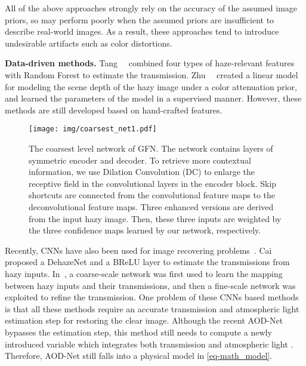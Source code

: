 \documentclass[10pt,twocolumn,letterpaper]{article}
\begin{document}
All of the above approaches strongly rely on the accuracy of the assumed image priors, so may perform poorly when the
assumed priors are insufficient to describe
real-world images. As a result, these
approaches tend to introduce undesirable artifacts such
as color distortions.

\vspace{-2mm}
{\flushleft \textbf{Data-driven methods.}}
Tang~\etal~\cite{tang2014investigating} combined four types of haze-relevant features with Random Forest
to estimate the transmission.
Zhu~\etal~\cite{zhu2015fast} created a linear model for
modeling the scene depth of the hazy image under a color attenuation prior, and learned the parameters of the model in a supervised manner.
However, these methods are still developed based on hand-crafted features.


\begin{figure*}[t]\footnotesize
	\begin{center}
		\texttt{[image: img/coarsest\_net1.pdf]}
	\end{center}
	\vspace{-0.3cm}
	\caption{The coarsest level network of GFN.
The network contains layers of symmetric
		encoder and decoder.
To retrieve more contextual information, we use Dilation Convolution (DC) to enlarge the receptive field in the convolutional layers in the encoder block.
Skip shortcuts are connected from the convolutional feature maps to the deconvolutional feature maps.
Three enhanced versions are derived from the input hazy image. Then, these three
		inputs are weighted by the three confidence maps learned by our network, respectively.
}
	\vspace{-0.3cm}
	\label{fig-net}
\end{figure*}


Recently,
CNNs have also been used for image recovering problems~\cite{cai2016dehazenet,li2017aod,xu2017learning,He_derain_2018,zhang2017image,zhang2016learning}.
Cai~\etal~\cite{cai2016dehazenet} proposed a DehazeNet and a BReLU layer to estimate the transmissions from hazy inputs.
In~\cite{ren2016single}, a coarse-scale network was first used to learn the mapping between hazy inputs and their transmissions, and then a fine-scale network was exploited to refine the transmission.
One problem of these CNNs based methods~\cite{cai2016dehazenet,ren2017deep,ren2016single} is that all these methods require an accurate transmission and atmospheric light estimation step for restoring the clear image.
Although the recent AOD-Net~\cite{li2017aod} bypasses the estimation step, this method still needs to compute a newly introduced variable  which integrates both transmission  and atmospheric light . Therefore, AOD-Net still falls into a physical model in \eqref{eq-math_model}.
\end{document}
